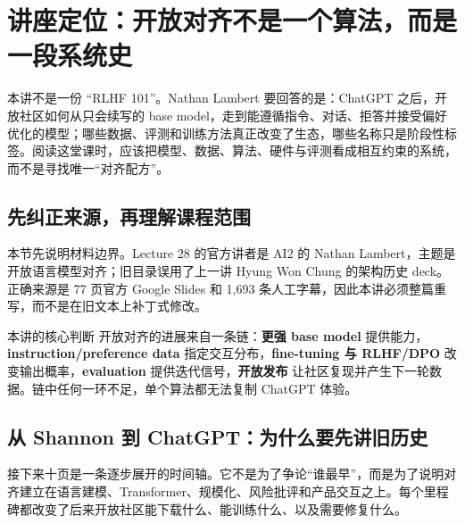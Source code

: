 \section{讲座定位：开放对齐不是一个算法，而是一段系统史}

本讲不是一份 ``RLHF 101''。Nathan Lambert 要回答的是：ChatGPT 之后，开放社区如何从只会续写的 base model，走到能遵循指令、对话、拒答并接受偏好优化的模型；哪些数据、评测和训练方法真正改变了生态，哪些名称只是阶段性标签。阅读这堂课时，应该把模型、数据、算法、硬件与评测看成相互约束的系统，而不是寻找唯一“对齐配方”。

\subsection{先纠正来源，再理解课程范围}

本节先说明材料边界。Lecture 28 的官方讲者是 AI2 的 Nathan Lambert，主题是开放语言模型对齐；旧目录误用了上一讲 Hyung Won Chung 的架构历史 deck。正确来源是 77 页官方 Google Slides 和 1,693 条人工字幕，因此本讲必须整篇重写，而不是在旧文本上补丁式修改。


\begin{importantbox}{本讲的核心判断}
开放对齐的进展来自一条链：\textbf{更强 base model} 提供能力，\textbf{instruction/preference data} 指定交互分布，\textbf{fine-tuning 与 RLHF/DPO} 改变输出概率，\textbf{evaluation} 提供迭代信号，\textbf{开放发布} 让社区复现并产生下一轮数据。链中任何一环不足，单个算法都无法复制 ChatGPT 体验。
\end{importantbox}


\subsection{从 Shannon 到 ChatGPT：为什么要先讲旧历史}

接下来十页是一条逐步展开的时间轴。它不是为了争论“谁最早”，而是为了说明对齐建立在语言建模、Transformer、规模化、风险批评和产品交互之上。每个里程碑都改变了后来开放社区能下载什么、能训练什么、以及需要修复什么。


